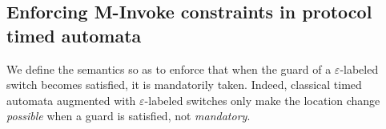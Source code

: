 %   
%   
%   
%   
%   
%   
% 
% 
% 


\subsection{Enforcing M-Invoke constraints in protocol timed automata}


We define the \MInvoke semantics so as to enforce that when the guard of a $\varepsilon$-labeled switch becomes satisfied, it is mandatorily taken. Indeed, classical timed automata augmented with $\varepsilon$-labeled switches only make the location change \emph{possible} when a guard is satisfied, not \emph{mandatory}.


